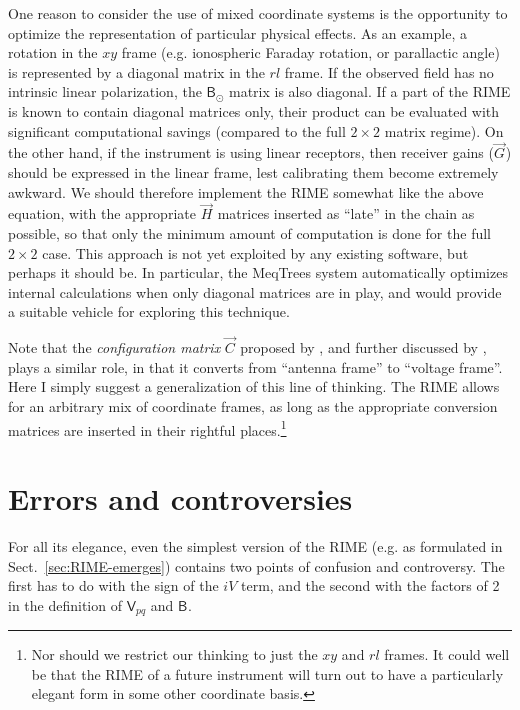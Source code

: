\documentclass[referee]{aa}
\newcommand{\jones}[2]{\vec {#1}_{#2}}
\newcommand{\coh}[2]{\mathsf{{#1}}_{{#2}}}
\begin{document}
One reason to consider the use of mixed coordinate systems is the opportunity to optimize the representation of particular physical effects. As an example, a rotation in the $xy$ frame (e.g. ionospheric Faraday rotation, or parallactic angle) is represented by a diagonal matrix in the $rl$ frame. If the observed field has no intrinsic linear polarization, the $\coh{B}{\odot}$ matrix is also diagonal. If a part of the RIME is known to contain diagonal matrices only, their product can be evaluated with significant computational savings (compared to the full $2\times2$ matrix regime). On the other hand, if the instrument is using linear receptors, then receiver gains ($\jones{G}{}$) should be expressed in the linear frame, lest calibrating them become extremely awkward. We should therefore implement the RIME somewhat like the above equation, with the appropriate $\jones{H}{}$ matrices inserted as ``late'' in the chain as possible, so that only the minimum amount of computation is done for the full $2\times2$ case. This approach is not yet exploited by any existing software, but perhaps it should be. In particular, the MeqTrees system \citep{meqtrees} automatically optimizes internal calculations when only diagonal matrices are in play, and would provide a suitable vehicle for exploring this technique.

Note that the {\em configuration matrix} $\jones{C}{}$ proposed by \citet{ME1}, and further discussed by \citet{JEN:note185}, plays a similar role, in that it converts from ``antenna frame'' to ``voltage frame''. Here I simply suggest a generalization of this line of thinking. The RIME allows for an arbitrary mix of coordinate frames, as long as the appropriate conversion matrices are inserted in their rightful places.\footnote{Nor should we restrict our thinking to just the $xy$ and $rl$ frames. It could well be that the RIME of a future instrument will turn out to have a particularly elegant form in some other coordinate basis.}

\section{Errors and controversies\label{sec:controversies}}

For all its elegance, even the simplest version of the RIME (e.g. as formulated in Sect.~\ref{sec:RIME-emerges}) contains two points of confusion and controversy. The first has to do with the sign of the $iV$ term, and the second with the factors of 2 in the definition of $\coh{V}{pq}$ and $\coh{B}{}$.
\end{document}
